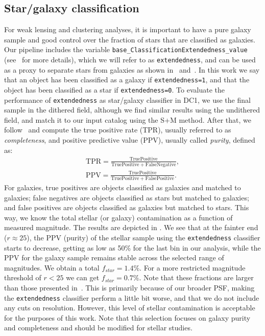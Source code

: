 \documentclass[a4paper,fleqn,usenatbib]{mnras}
\begin{document}
\subsection{Star/galaxy classification}
\label{sec:sg_sep}
For weak lensing and clustering analyses, it is important to have a pure galaxy sample and good control over the fraction of stars that are classified as galaxies. Our pipeline includes the variable \texttt{base\_ClassificationExtendedness\_value} (see~\citet{2018PASJ...70S...5B} for more details), which we will refer to as \texttt{extendedness}, and can be used as a proxy to separate stars from galaxies as shown in~\citet{2018PASJ...70S..25M} and~\citet{2018PASJ...70S...5B}. In this work we say that an object has been classified as a galaxy if \texttt{extendedness=1}, and that the object has been classified as a star if \texttt{extendedness=0}. To evaluate the performance of \texttt{extendedness} as star/galaxy classifier in DC1, we use the final sample in the dithered field, although we find similar results using the undithered field, and match it to our input catalog using the \textsf{S+M} method. After that, we follow~\citet{2018MNRAS.481.5451S} and compute the true positive rate (TPR), usually referred to as \textit{completeness}, and positive predictive value (PPV), usually called \textit{purity}, defined as:
\begin{eqnarray}
\mathrm{TPR} = \frac{\mathrm{True Positive}}{\mathrm{True Positive}+\mathrm{False Negative}}, \\
\mathrm{PPV} = \frac{\mathrm{True Positive}}{\mathrm{True Positive}+\mathrm{False Positive}}.
\end{eqnarray}
For galaxies, true positives are objects classified as galaxies and matched to galaxies; false negatives are objects classified as stars but matched to galaxies; and false positives are objects classified as galaxies but matched to stars. This way, we know the total stellar (or galaxy) contamination as a function of measured magnitude. The results are depicted in . We see that at the fainter end ($r \approx 25$), the PPV (purity) of the stellar sample using the \texttt{extendedness} classifier starts to decrease, getting as low as 50\% for the last bin in our analysis, while the PPV for the galaxy sample remains stable across the selected range of magnitudes. We obtain a total $f_{star}=1.4\%$. For a more restricted magnitude threshold of $r < 25$ we can get $f_{star} = 0.7\%$. Note that these fractions are larger than those presented in~\citet{2018PASJ...70S...5B}. This is primarily because of our broader PSF, making the \texttt{extendedness} classifier perform a little bit worse, and that we do not include any cuts on resolution. However, this level of stellar contamination is acceptable for the purposes of this work. Note that this selection focuses on galaxy purity and completeness and should be modified for stellar studies.
\end{document}
